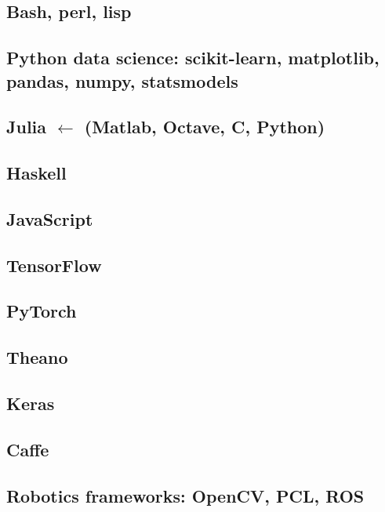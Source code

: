 %
%

\subsection{Bash, perl, lisp}

\subsection{Python data science: scikit-learn, matplotlib, pandas,
              numpy, statsmodels}

\subsection{Julia $\leftarrow$ (Matlab, Octave, C, Python)}

\subsection{Haskell}

\subsection{JavaScript}

\subsection{TensorFlow}

\subsection{PyTorch}

\subsection{Theano}

\subsection{Keras}

\subsection{Caffe}

\subsection{Robotics frameworks: OpenCV, PCL, ROS}
